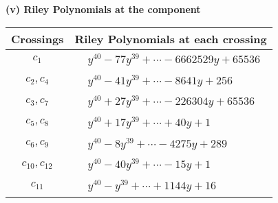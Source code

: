 \documentclass[1p]{elsarticle_modified}
\theoremstyle{definition}
\begin{document}
\flushleft \textbf{(v) Riley Polynomials at the component}\newline \\
\begin{tabular}{m{50pt}|m{274pt}}
Crossings & \hspace{64pt}Riley Polynomials at each crossing \\
\hline $$\begin{aligned}c_{1}\end{aligned}$$&$\begin{aligned}
&y^{40}-77 y^{39}+\cdots-6662529 y+65536
\end{aligned}$\\
\hline $$\begin{aligned}c_{2},c_{4}\end{aligned}$$&$\begin{aligned}
&y^{40}-41 y^{39}+\cdots-8641 y+256
\end{aligned}$\\
\hline $$\begin{aligned}c_{3},c_{7}\end{aligned}$$&$\begin{aligned}
&y^{40}+27 y^{39}+\cdots-226304 y+65536
\end{aligned}$\\
\hline $$\begin{aligned}c_{5},c_{8}\end{aligned}$$&$\begin{aligned}
&y^{40}+17 y^{39}+\cdots+40 y+1
\end{aligned}$\\
\hline $$\begin{aligned}c_{6},c_{9}\end{aligned}$$&$\begin{aligned}
&y^{40}-8 y^{39}+\cdots-4275 y+289
\end{aligned}$\\
\hline $$\begin{aligned}c_{10},c_{12}\end{aligned}$$&$\begin{aligned}
&y^{40}-40 y^{39}+\cdots-15 y+1
\end{aligned}$\\
\hline $$\begin{aligned}c_{11}\end{aligned}$$&$\begin{aligned}
&y^{40}- y^{39}+\cdots+1144 y+16
\end{aligned}$\\
\hline
\end{tabular}\\~\\
\end{document}

